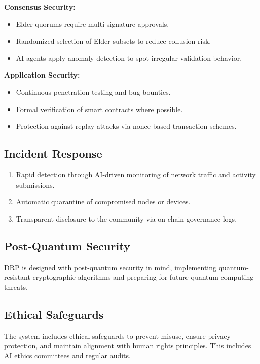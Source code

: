 \documentclass[11pt,a4paper]{article}
\begin{document}
\textbf{Consensus Security:}
\begin{itemize}
    \item Elder quorums require multi-signature approvals.
    \item Randomized selection of Elder subsets to reduce collusion risk.
    \item AI-agents apply anomaly detection to spot irregular validation behavior.
\end{itemize}

\textbf{Application Security:}
\begin{itemize}
    \item Continuous penetration testing and bug bounties.
    \item Formal verification of smart contracts where possible.
    \item Protection against replay attacks via nonce-based transaction schemes.
\end{itemize}

\subsection{Incident Response}
\begin{enumerate}
    \item Rapid detection through AI-driven monitoring of network traffic and activity submissions.
    \item Automatic quarantine of compromised nodes or devices.
    \item Transparent disclosure to the community via on-chain governance logs.
\end{enumerate}

\subsection{Post-Quantum Security}
DRP is designed with post-quantum security in mind, implementing quantum-resistant cryptographic algorithms and preparing for future quantum computing threats.

\subsection{Ethical Safeguards}
The system includes ethical safeguards to prevent misuse, ensure privacy protection, and maintain alignment with human rights principles. This includes AI ethics committees and regular audits.

\end{document}
